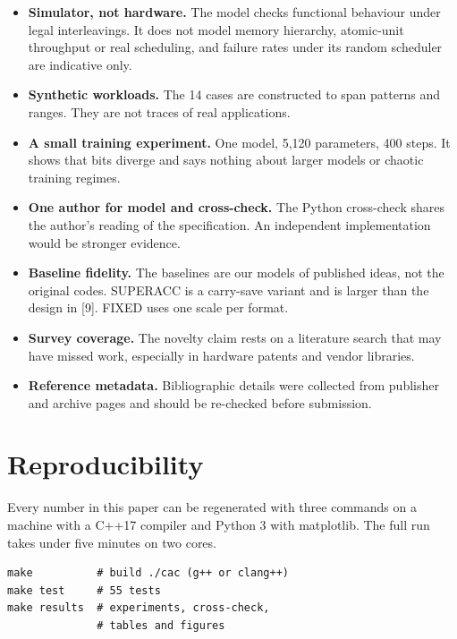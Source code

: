 \documentclass[journal]{IEEEtran}
\begin{document}
\begin{itemize}
\item
  \textbf{Simulator, not hardware.} The model checks functional
  behaviour under legal interleavings. It does not model memory
  hierarchy, atomic-unit throughput or real scheduling, and failure
  rates under its random scheduler are indicative only.
\item
  \textbf{Synthetic workloads.} The 14 cases are constructed to span
  patterns and ranges. They are not traces of real applications.
\item
  \textbf{A small training experiment.} One model, 5,120 parameters, 400
  steps. It shows that bits diverge and says nothing about larger models
  or chaotic training regimes.
\item
  \textbf{One author for model and cross-check.} The Python cross-check
  shares the author's reading of the specification. An independent
  implementation would be stronger evidence.
\item
  \textbf{Baseline fidelity.} The baselines are our models of published
  ideas, not the original codes. SUPERACC is a carry-save variant and is
  larger than the design in {[}9{]}. FIXED uses one scale per format.
\item
  \textbf{Survey coverage.} The novelty claim rests on a literature
  search that may have missed work, especially in hardware patents and
  vendor libraries.
\item
  \textbf{Reference metadata.} Bibliographic details were collected from
  publisher and archive pages and should be re-checked before
  submission.
\end{itemize}

\hypertarget{reproducibility}{%
\section{Reproducibility}\label{reproducibility}}

Every number in this paper can be regenerated with three commands on a
machine with a C++17 compiler and Python 3 with matplotlib. The full run
takes under five minutes on two cores.

\begin{lstlisting}
make          # build ./cac (g++ or clang++)
make test     # 55 tests
make results  # experiments, cross-check,
              # tables and figures
\end{lstlisting}
\end{document}

